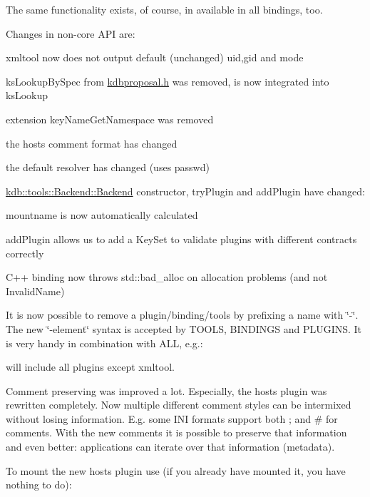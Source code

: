 The same functionality exists, of course, in available in all bindings, too.

Changes in non-\/core A\+PI are\+:


\begin{DoxyItemize}
\item xmltool now does not output default (unchanged) uid,gid and mode
\item ks\+Lookup\+By\+Spec from \mbox{\hyperlink{kdbproposal_8h}{kdbproposal.\+h}} was removed, is now integrated into ks\+Lookup
\item extension key\+Name\+Get\+Namespace was removed
\item the hosts comment format has changed
\item the default resolver has changed (uses passwd)
\item \mbox{\hyperlink{classkdb_1_1tools_1_1Backend_a1650b149ebf313ee8cd3472247212263}{kdb\+::tools\+::\+Backend\+::\+Backend}} constructor, try\+Plugin and add\+Plugin have changed\+:
\item mountname is now automatically calculated
\item add\+Plugin allows us to add a Key\+Set to validate plugins with different contracts correctly
\item C++ binding now throws std\+::bad\+\_\+alloc on allocation problems (and not Invalid\+Name)
\end{DoxyItemize}

It is now possible to remove a plugin/binding/tools by prefixing a name with \char`\"{}-\/\char`\"{}. The new \char`\"{}-\/element\char`\"{} syntax is accepted by T\+O\+O\+LS, B\+I\+N\+D\+I\+N\+GS and P\+L\+U\+G\+I\+NS. It is very handy in combination with A\+LL, e.\+g.\+:


\begin{DoxyCode}{0}
\end{DoxyCode}


will include all plugins except xmltool.

Comment preserving was improved a lot. Especially, the hosts plugin was rewritten completely. Now multiple different comment styles can be intermixed without losing information. E.\+g. some I\+NI formats support both ; and \# for comments. With the new comments it is possible to preserve that information and even better\+: applications can iterate over that information (metadata).

To mount the new hosts plugin use (if you already have mounted it, you have nothing to do)\+:


